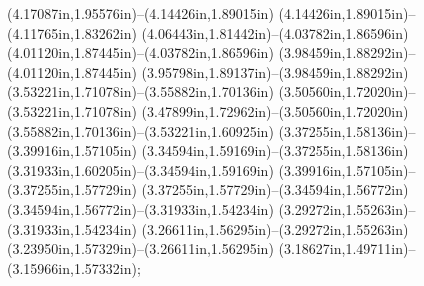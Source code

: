 (4.17087in,1.95576in)--(4.14426in,1.89015in) (4.14426in,1.89015in)--(4.11765in,1.83262in) (4.06443in,1.81442in)--(4.03782in,1.86596in) (4.01120in,1.87445in)--(4.03782in,1.86596in) (3.98459in,1.88292in)--(4.01120in,1.87445in) (3.95798in,1.89137in)--(3.98459in,1.88292in) (3.53221in,1.71078in)--(3.55882in,1.70136in) (3.50560in,1.72020in)--(3.53221in,1.71078in) (3.47899in,1.72962in)--(3.50560in,1.72020in) (3.55882in,1.70136in)--(3.53221in,1.60925in) (3.37255in,1.58136in)--(3.39916in,1.57105in) (3.34594in,1.59169in)--(3.37255in,1.58136in) (3.31933in,1.60205in)--(3.34594in,1.59169in) (3.39916in,1.57105in)--(3.37255in,1.57729in) (3.37255in,1.57729in)--(3.34594in,1.56772in) (3.34594in,1.56772in)--(3.31933in,1.54234in) (3.29272in,1.55263in)--(3.31933in,1.54234in) (3.26611in,1.56295in)--(3.29272in,1.55263in) (3.23950in,1.57329in)--(3.26611in,1.56295in) (3.18627in,1.49711in)--(3.15966in,1.57332in);

